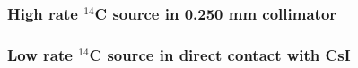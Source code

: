 \documentclass[11pt]{article}
\newcommand{\nuc}[2]{\ensuremath{^{#1}}#2}
\begin{document}
\subsubsection{High rate \nuc{14}{C} source in 0.250 mm collimator} 

 
 
 
 \subsubsection{Low rate \nuc{14}{C} source in direct contact with CsI} 

 
\end{document}
